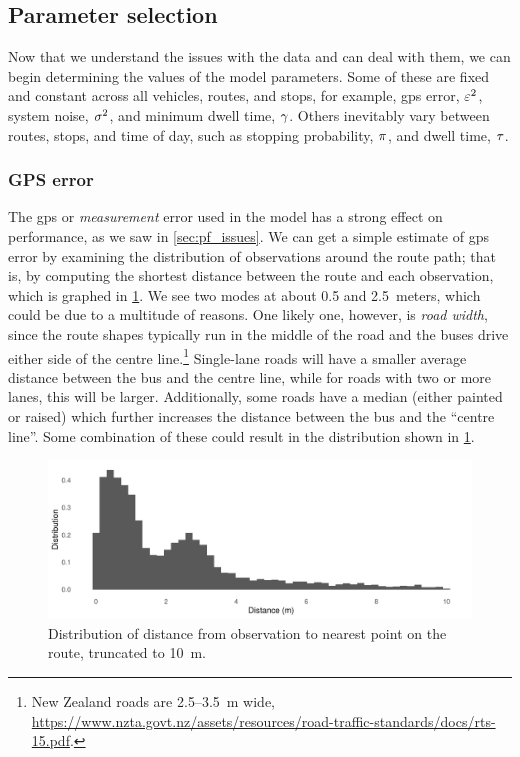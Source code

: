 \subsection{Parameter selection}
\label{sec:pf_params}

Now that we understand the issues with the data and can deal with them, we can begin determining the values of the model parameters. Some of these are fixed and constant across all vehicles, routes, and stops, for example, \gls{gps} error, $\varepsilon^2$, system noise, $\sigma^2$, and minimum dwell time, $\gamma$. Others inevitably vary between routes, stops, and time of day, such as stopping probability, $\pi$, and dwell time, $\tau$.


\subsubsection{GPS error}
\label{sec:pf_params_gps}

The \gls{gps} or \emph{measurement} error used in the model has a strong effect on performance, as we saw in \cref{sec:pf_issues}. We can get a simple estimate of \gls{gps} error by examining the distribution of observations around the route path; that is, by computing the shortest distance between the route and each observation, which is graphed in \cref{fig:pf_param_gps}. We see two modes at about 0.5 and 2.5~meters, which could be due to a multitude of reasons. One likely one, however, is \emph{road width}, since the route shapes typically run in the middle of the road and the buses drive either side of the centre line.\footnote{New Zealand roads are 2.5--3.5~m wide, \url{https://www.nzta.govt.nz/assets/resources/road-traffic-standards/docs/rts-15.pdf}.} Single-lane roads will have a smaller average distance between the bus and the centre line, while for roads with two or more lanes, this will be larger. Additionally, some roads have a median (either painted or raised) which further increases the distance between the bus and the ``centre line''. Some combination of these could result in the distribution shown in \cref{fig:pf_param_gps}.



\begin{knitrout}\small
{}\color{fgcolor}\begin{figure}
\includegraphics[width=\maxwidth]{figure/pf_param_gps-1} \caption[Distribution of distance from observation to route.]{Distribution of distance from observation to nearest point on the route, truncated to 10~m.}\label{fig:pf_param_gps}
\end{figure}


\end{knitrout}

